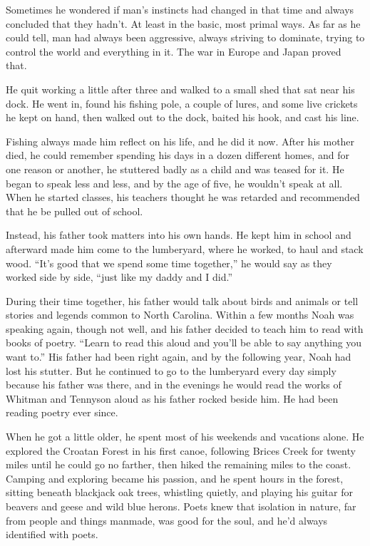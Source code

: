\documentclass[10pt, twoside, openright]{book}
\begin{document}
Sometimes he wondered if man's instincts had changed in that time and
always concluded that they hadn't. At least in the basic, most primal
ways. As far as he could tell, man had always been aggressive, always
striving to dominate, trying to control the world and everything in it.
The war in Europe and Japan proved that.

He quit working a little after three and walked to a small shed that sat
near his dock. He went in, found his fishing pole, a couple of lures,
and some live crickets he kept on hand, then walked out to the dock,
baited his hook, and cast his line.

Fishing always made him reflect on his life, and he did it now. After
his mother died, he could remember spending his days in a dozen
different homes, and for one reason or another, he stuttered badly as a
child and was teased for it. He began to speak less and less, and by the
age of five, he wouldn't speak at all. When he started classes, his
teachers thought he was retarded and recommended that he be pulled out
of school.

Instead, his father took matters into his own hands. He kept him in
school and afterward made him come to the lumberyard, where he worked,
to haul and stack wood. ``It's good that we spend some time together,''
he would say as they worked side by side, ``just like my daddy and I
did.''

During their time together, his father would talk about birds and
animals or tell stories and legends common to North Carolina. Within a
few months Noah was speaking again, though not well, and his father
decided to teach him to read with books of poetry. ``Learn to read this
aloud and you'll be able to say anything you want to.'' His father had
been right again, and by the following year, Noah had lost his stutter.
But he continued to go to the lumberyard every day simply because his
father was there, and in the evenings he would read the works of Whitman
and Tennyson aloud as his father rocked beside him. He had been reading
poetry ever since.

When he got a little older, he spent most of his weekends and vacations
alone. He explored the Croatan Forest in his first canoe, following
Brices Creek for twenty miles until he could go no farther, then hiked
the remaining miles to the coast. Camping and exploring became his
passion, and he spent hours in the forest, sitting beneath blackjack oak
trees, whistling quietly, and playing his guitar for beavers and geese
and wild blue herons. Poets knew that isolation in nature, far from
people and things manmade, was good for the soul, and he'd always
identified with poets.
\end{document}
